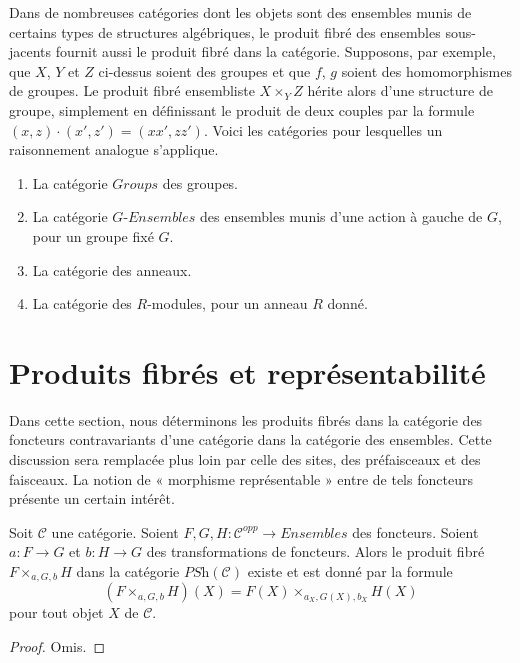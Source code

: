 \medskip\noindent
Dans de nombreuses catégories dont les objets sont des ensembles munis
de certains types de structures algébriques, le produit fibré des ensembles
sous-jacents fournit aussi le produit fibré dans la catégorie. Supposons,
par exemple, que $X$, $Y$ et $Z$ ci-dessus soient des groupes et que
$f$, $g$ soient des homomorphismes de groupes. Le produit fibré ensembliste
$X \times_Y Z$ hérite alors d'une structure de groupe, simplement en
définissant le produit de deux couples par la formule
$(x, z) \cdot (x', z') = (xx', zz')$. Voici les catégories
pour lesquelles un raisonnement analogue s'applique.
\begin{enumerate}
\item La catégorie $\textit{Groups}$ des groupes.
\item La catégorie $G\textit{-Ensembles}$ des ensembles
munis d'une action à gauche de $G$, pour un groupe fixé $G$.
\item La catégorie des anneaux.
\item La catégorie des $R$-modules, pour un anneau $R$ donné.
\end{enumerate}




\section{Produits fibrés et représentabilité}
\label{section-representable-map-presheaves}

\noindent
Dans cette section, nous déterminons les produits fibrés dans la
catégorie des foncteurs contravariants d'une catégorie
dans la catégorie des ensembles. Cette discussion sera remplacée plus loin
par celle des sites, des préfaisceaux et des faisceaux. La notion de
« morphisme représentable » entre de tels foncteurs présente un certain
intérêt.

\begin{lemma}
\label{lemma-fibre-product-presheaves}
Soit $\mathcal{C}$ une catégorie.
Soient $F, G, H : \mathcal{C}^{opp} \to \textit{Ensembles}$
des foncteurs. Soient $a : F \to G$ et $b : H \to G$ des
transformations de foncteurs. Alors le produit fibré
$F \times_{a, G, b} H$ dans la catégorie
$\textit{PSh}(\mathcal{C})$
existe et est donné par la formule
$$
(F \times_{a, G, b} H)(X) =
F(X) \times_{a_X, G(X), b_X} H(X)
$$
pour tout objet $X$ de $\mathcal{C}$.
\end{lemma}

\begin{proof}
Omis.
\end{proof}

